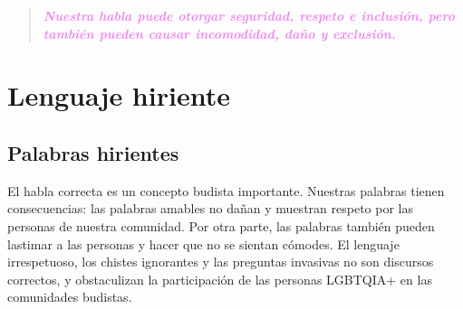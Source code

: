 \documentclass[12pt,openany]{book}
\begin{document}
\newpage
\thispagestyle{empty}
\begin{figure}[h]
    \centering
\end{figure}

\begin{quote}
\centering
\doublespacing
\textit{\Large \textcolor{violet}{\textbf{Nuestra habla puede otorgar seguridad, respeto e inclusión, pero también pueden causar incomodidad, daño y exclusión.}}}
\end{quote}

\chapter*{Lenguaje hiriente }

\section*{Palabras hirientes}

El habla correcta es un concepto budista importante. Nuestras palabras tienen consecuencias: las palabras amables no dañan y muestran respeto por las personas de nuestra comunidad. Por otra parte, las palabras también pueden lastimar a las personas y hacer que no se sientan cómodes. El lenguaje irrespetuoso, los chistes ignorantes y las preguntas invasivas no son discursos correctos, y obstaculizan la participación de las personas LGBTQIA+ en las comunidades budistas.
\end{document}
